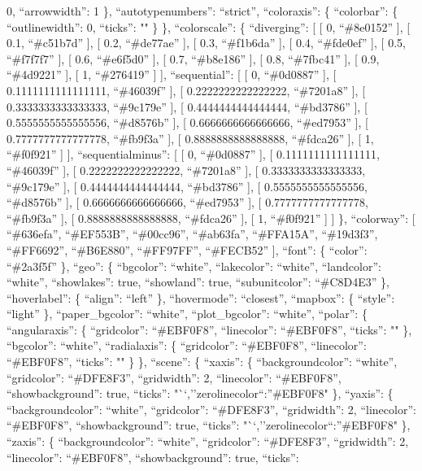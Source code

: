 \documentclass[
]{article}
\begin{document}
0, ``arrowwidth'': 1 \}, ``autotypenumbers'': ``strict'', ``coloraxis'':
\{ ``colorbar'': \{ ``outlinewidth'': 0, ``ticks'': "" \} \},
``colorscale'': \{ ``diverging'': {[} {[} 0, ``\#8e0152'' {]}, {[} 0.1,
``\#c51b7d'' {]}, {[} 0.2, ``\#de77ae'' {]}, {[} 0.3, ``\#f1b6da'' {]},
{[} 0.4, ``\#fde0ef'' {]}, {[} 0.5, ``\#f7f7f7'' {]}, {[} 0.6,
``\#e6f5d0'' {]}, {[} 0.7, ``\#b8e186'' {]}, {[} 0.8, ``\#7fbc41'' {]},
{[} 0.9, ``\#4d9221'' {]}, {[} 1, ``\#276419'' {]} {]}, ``sequential'':
{[} {[} 0, ``\#0d0887'' {]}, {[} 0.1111111111111111, ``\#46039f'' {]},
{[} 0.2222222222222222, ``\#7201a8'' {]}, {[} 0.3333333333333333,
``\#9c179e'' {]}, {[} 0.4444444444444444, ``\#bd3786'' {]}, {[}
0.5555555555555556, ``\#d8576b'' {]}, {[} 0.6666666666666666,
``\#ed7953'' {]}, {[} 0.7777777777777778, ``\#fb9f3a'' {]}, {[}
0.8888888888888888, ``\#fdca26'' {]}, {[} 1, ``\#f0f921'' {]} {]},
``sequentialminus'': {[} {[} 0, ``\#0d0887'' {]}, {[}
0.1111111111111111, ``\#46039f'' {]}, {[} 0.2222222222222222,
``\#7201a8'' {]}, {[} 0.3333333333333333, ``\#9c179e'' {]}, {[}
0.4444444444444444, ``\#bd3786'' {]}, {[} 0.5555555555555556,
``\#d8576b'' {]}, {[} 0.6666666666666666, ``\#ed7953'' {]}, {[}
0.7777777777777778, ``\#fb9f3a'' {]}, {[} 0.8888888888888888,
``\#fdca26'' {]}, {[} 1, ``\#f0f921'' {]} {]} \}, ``colorway'': {[}
``\#636efa'', ``\#EF553B'', ``\#00cc96'', ``\#ab63fa'', ``\#FFA15A'',
``\#19d3f3'', ``\#FF6692'', ``\#B6E880'', ``\#FF97FF'', ``\#FECB52''
{]}, ``font'': \{ ``color'': ``\#2a3f5f'' \}, ``geo'': \{ ``bgcolor'':
``white'', ``lakecolor'': ``white'', ``landcolor'': ``white'',
``showlakes'': true, ``showland'': true, ``subunitcolor'': ``\#C8D4E3''
\}, ``hoverlabel'': \{ ``align'': ``left'' \}, ``hovermode'':
``closest'', ``mapbox'': \{ ``style'': ``light'' \}, ``paper\_bgcolor'':
``white'', ``plot\_bgcolor'': ``white'', ``polar'': \{ ``angularaxis'':
\{ ``gridcolor'': ``\#EBF0F8'', ``linecolor'': ``\#EBF0F8'', ``ticks'':
"" \}, ``bgcolor'': ``white'', ``radialaxis'': \{ ``gridcolor'':
``\#EBF0F8'', ``linecolor'': ``\#EBF0F8'', ``ticks'': "" \} \},
``scene'': \{ ``xaxis'': \{ ``backgroundcolor'': ``white'',
``gridcolor'': ``\#DFE8F3'', ``gridwidth'': 2, ``linecolor'':
``\#EBF0F8'', ``showbackground'': true, ``ticks'':
"``,''zerolinecolor``:''\#EBF0F8" \}, ``yaxis'': \{ ``backgroundcolor'':
``white'', ``gridcolor'': ``\#DFE8F3'', ``gridwidth'': 2, ``linecolor'':
``\#EBF0F8'', ``showbackground'': true, ``ticks'':
"``,''zerolinecolor``:''\#EBF0F8" \}, ``zaxis'': \{ ``backgroundcolor'':
``white'', ``gridcolor'': ``\#DFE8F3'', ``gridwidth'': 2, ``linecolor'':
``\#EBF0F8'', ``showbackground'': true, ``ticks'':
\end{document}
